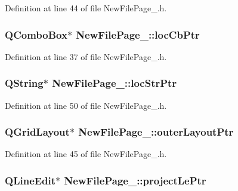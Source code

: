Definition at line 44 of file New\-File\-Page\-\_.\-h.

\hypertarget{class_new_file_page__4_afd3456441e46868a662023c1f162c7c0}{
\subsubsection[{loc\-Cb\-Ptr}]{\setlength{\rightskip}{0pt plus 5cm}Q\-Combo\-Box$\ast$ New\-File\-Page\-\_\-::loc\-Cb\-Ptr\hspace{0.3cm}{\ttfamily [private]}}}\label{class_new_file_page__4_afd3456441e46868a662023c1f162c7c0}


Definition at line 37 of file New\-File\-Page\-\_.\-h.

\hypertarget{class_new_file_page__4_a1ec00c3d6a8bee7a1b0bfa28d878f06a}{
\subsubsection[{loc\-Str\-Ptr}]{\setlength{\rightskip}{0pt plus 5cm}Q\-String$\ast$ New\-File\-Page\-\_\-::loc\-Str\-Ptr\hspace{0.3cm}{\ttfamily [private]}}}\label{class_new_file_page__4_a1ec00c3d6a8bee7a1b0bfa28d878f06a}


Definition at line 50 of file New\-File\-Page\-\_.\-h.

\hypertarget{class_new_file_page__4_a4b4a6d04dd80df11c8acaf2939a5000e}{
\subsubsection[{outer\-Layout\-Ptr}]{\setlength{\rightskip}{0pt plus 5cm}Q\-Grid\-Layout$\ast$ New\-File\-Page\-\_\-::outer\-Layout\-Ptr\hspace{0.3cm}{\ttfamily [private]}}}\label{class_new_file_page__4_a4b4a6d04dd80df11c8acaf2939a5000e}


Definition at line 45 of file New\-File\-Page\-\_.\-h.

\hypertarget{class_new_file_page__4_a1373433031aa8284d1e4b597b2b3ef5f}{
\subsubsection[{project\-Le\-Ptr}]{\setlength{\rightskip}{0pt plus 5cm}Q\-Line\-Edit$\ast$ New\-File\-Page\-\_\-::project\-Le\-Ptr\hspace{0.3cm}{\ttfamily [private]}}}\label{class_new_file_page__4_a1373433031aa8284d1e4b597b2b3ef5f}


